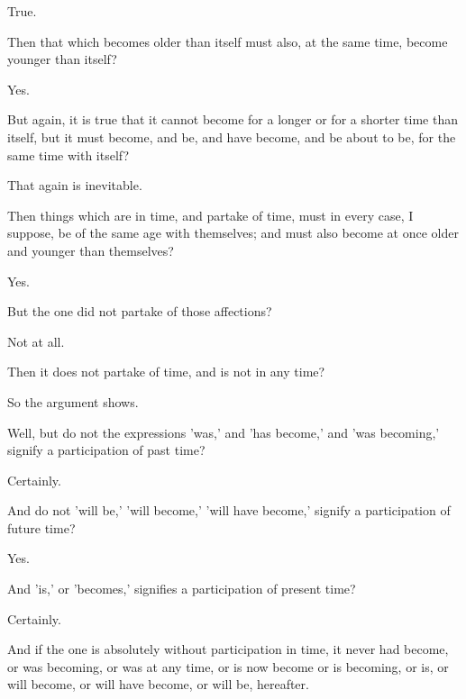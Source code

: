 \documentclass[11pt,letter]{article}
\begin{document}
\par  True.

\par  Then that which becomes older than itself must also, at the same time, become younger than itself?

\par  Yes.

\par  But again, it is true that it cannot become for a longer or for a shorter time than itself, but it must become, and be, and have become, and be about to be, for the same time with itself?

\par  That again is inevitable.

\par  Then things which are in time, and partake of time, must in every case, I suppose, be of the same age with themselves; and must also become at once older and younger than themselves?

\par  Yes.

\par  But the one did not partake of those affections?

\par  Not at all.

\par  Then it does not partake of time, and is not in any time?

\par  So the argument shows.

\par  Well, but do not the expressions 'was,' and 'has become,' and 'was becoming,' signify a participation of past time?

\par  Certainly.

\par  And do not 'will be,' 'will become,' 'will have become,' signify a participation of future time?

\par  Yes.

\par  And 'is,' or 'becomes,' signifies a participation of present time?

\par  Certainly.

\par  And if the one is absolutely without participation in time, it never had become, or was becoming, or was at any time, or is now become or is becoming, or is, or will become, or will have become, or will be, hereafter.
\end{document}
